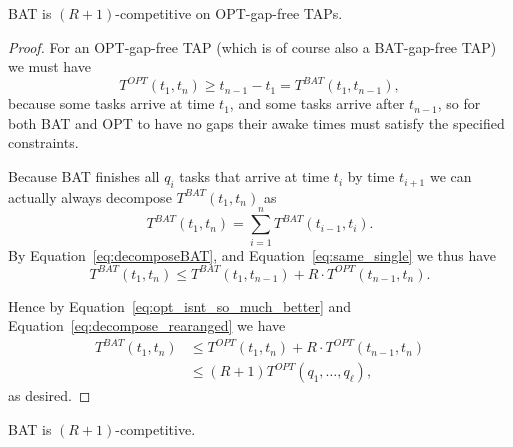 \begin{proposition}
  \label{prop:no_optgaps}
  BAT is $(R+1)$-competitive on OPT-gap-free TAPs.
\end{proposition}
\begin{proof}
  For an OPT-gap-free TAP (which is of course also a BAT-gap-free
  TAP) we must have
  \begin{equation}
    \label{eq:opt_isnt_so_much_better}
    T^{OPT}(t_1, t_n) \ge t_{n-1} - t_1 = T^{BAT}(t_1, t_{n-1}),
  \end{equation}
  because some tasks arrive at time $t_1$, and some tasks arrive
  after $t_{n-1}$, so for both BAT and OPT to have no gaps their
  awake times must satisfy the specified constraints.

  Because BAT finishes all $q_{i}$ tasks that arrive at time $t_i$
  by time $t_{i+1}$ we can actually always decompose
  $T^{BAT}(t_1, t_n)$ as 
  \begin{equation}
    \label{eq:decomposeBAT}
    T^{BAT}(t_1, t_n) = \sum_{i=1}^n T^{BAT}(t_{i-1}, t_i).
  \end{equation}
  By Equation~\eqref{eq:decomposeBAT}, and
  Equation~\eqref{eq:same_single} we thus have 
  \begin{equation}
    \label{eq:decompose_rearanged}
    T^{BAT}(t_1, t_n) \le T^{BAT}(t_1, t_{n-1}) + R \cdot T^{OPT}(t_{n-1}, t_n).
  \end{equation}

  Hence by Equation~\eqref{eq:opt_isnt_so_much_better} and
  Equation~\eqref{eq:decompose_rearanged} we have
  \begin{align*}
    T^{BAT}(t_1, t_n) &\le T^{OPT}(t_1, t_n) + R\cdot T^{OPT}(t_{n-1}, t_n)\\
                                 &\le (R+1)T^{OPT}(q_1, \ldots, q_\ell),
  \end{align*}
  as desired.
\end{proof}

\begin{theorem}
  \label{thm:constant_competitive}
  BAT is $(R+1)$-competitive.
\end{theorem}

